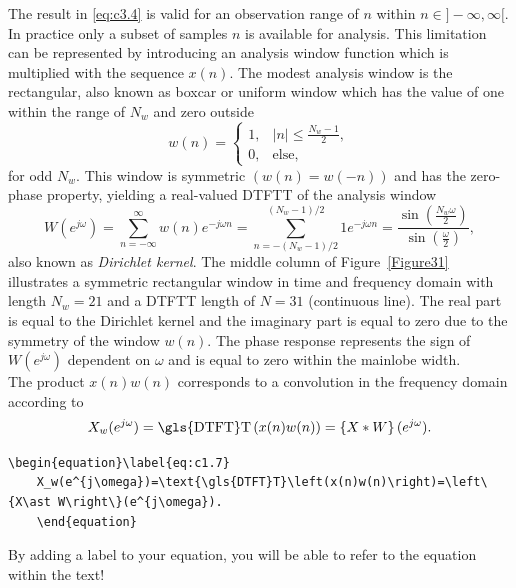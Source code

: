 \noindent The result in \eqref{eq:c3.4} is valid for an observation range of $n$ within $n\in]-\infty,\infty[$. In practice only a subset of samples $n$ is available for analysis. This limitation can be represented by introducing an analysis window function which is multiplied with the sequence $x(n)$. The modest analysis window is the rectangular, also known as boxcar or uniform window which has the value of one within the range of $N_w$ and zero outside
\begin{equation}\label{eq:c3.5}
w(n)=\begin{cases}1, & |n|\leq\frac{N_w-1}{2},\\
0, & \text{else},
\end{cases}
\end{equation}
for odd $N_w$.
This window is symmetric $(w(n)=w(-n))$ and has the zero-phase property, yielding a real-valued \gls{DTFT}T of the analysis window
\begin{equation}\label{eq:c3.6}
W(e^{j\omega})=\sum_{n=-\infty}^{\infty}w(n)e^{-j\omega n}=\sum_{n=-(N_w-1)/{2}}^{(N_w-1)/{2}}1e^{-j\omega n}=\frac{\sin\left(\frac{N_w\omega}{2}\right)}{\sin\left(\frac{\omega}{2}\right)},
\end{equation}
also known as \textit{Dirichlet kernel}. The middle column of Figure~\ref{Figure31} illustrates a symmetric rectangular window in time and frequency domain with length $N_w=21$ and a \gls{DTFT}T length of $N=31$ (continuous line). The real part is equal to the Dirichlet kernel and the imaginary part is equal to zero due to the symmetry of the window $w(n)$. The phase response represents the sign of $W(e^{j\omega})$ dependent on $\omega$ and is equal to zero within the mainlobe width.\\

\noindent The product $x(n)w(n)$ corresponds to a convolution in the frequency domain according to
\begin{equation}\label{eq:c1.7}
X_w(e^{j\omega})=\text{\gls{DTFT}T}\left(x(n)w(n)\right)=\left\{X\ast W\right\}(e^{j\omega}).
\end{equation}

\begin{mdframed}
	\begin{lstlisting}[language = Tex, caption={Add formulars to your text}, linewidth = 150mm]
	\begin{equation}\label{eq:c1.7}
	X_w(e^{j\omega})=\text{\gls{DTFT}T}\left(x(n)w(n)\right)=\left\{X\ast W\right\}(e^{j\omega}).
	\end{equation}
	\end{lstlisting}
	By adding a label to your equation, you will be able to refer to the equation within the text!
\end{mdframed}


